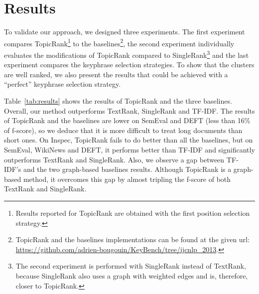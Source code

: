 \section{Results}
\label{sec:results}
  To validate our approach, we designed three experiments. The first experiment
  compares TopicRank\footnote{Results reported for TopicRank are obtained with
  the first position selection strategy.} to the baselines\footnote{TopicRank
  and the baselines implementations can be found at the given url:
  \url{https://github.com/adrien-bougouin/KeyBench/tree/ijcnlp_2013}.}, the
  second experiment individually evaluates the modifications of TopicRank
  compared to SingleRank\footnote{The second experiment is performed with
  SingleRank instead of TextRank, because SingleRank also uses a graph with
  weighted edges and is, therefore, closer to TopicRank.} and the last
  experiment compares the keyphrase selection strategies. To show that the
  clusters are well ranked, we also present the results that could be achieved
  with a ``perfect'' keyphrase selection strategy.

  Table~\ref{tab:results} shows the results of TopicRank and the three
  baselines. Overall, our method outperforms TextRank, SingleRank and TF-IDF.
  The results of TopicRank and the baselines are lower on SemEval and DEFT (less
  than 16\% of f-score), so we deduce that it is more difficult to treat long
  documents than short ones. On Inspec, TopicRank fails to do better than all
  the baselines, but on SemEval, WikiNews and DEFT, it performs better than
  TF-IDF and significantly outperforms TextRank and SingleRank. Also, we observe
  a gap between TF-IDF's and the two graph-based baselines results. Although
  TopicRank is a graph-based method, it overcomes this gap by almost tripling
  the f-score of both TextRank and SingleRank.

